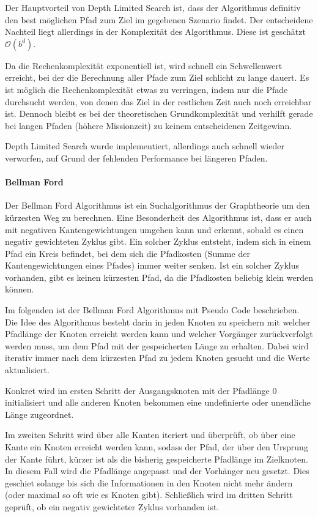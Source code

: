 \documentclass{article}
\begin{document}
Der Hauptvorteil von Depth Limited Search ist, dass der Algorithmus definitiv den
best möglichen Pfad zum Ziel im gegebenen Szenario findet. Der entscheidene
Nachteil liegt allerdings in der Komplexität des Algorithmus. Diese ist geschätzt 
$\mathcal O(b^d)$.

Da die Rechenkomplexität exponentiell ist, wird schnell ein Schwellenwert
erreicht, bei der die Berechnung aller Pfade zum Ziel schlicht zu lange dauert.
Es ist möglich die Rechenkomplexität etwas zu verringen, indem nur die Pfade
durchsucht werden, von denen das Ziel in der restlichen Zeit auch noch
erreichbar ist. Dennoch bleibt es bei der theoretischen Grundkomplexität und
verhilft gerade bei langen Pfaden (höhere Missionzeit) zu keinem entscheidenen
Zeitgewinn.

Depth Limited Search wurde implementiert, allerdings auch schnell wieder
verworfen, auf Grund der fehlenden Performance bei längeren Pfaden.

\paragraph{Bellman Ford}

Der Bellman Ford Algorithmus ist ein Suchalgorithmus der Graphtheorie um den
kürzesten Weg zu berechnen. Eine Besonderheit des Algorithmus ist, dass er auch
mit negativen Kantengewichtungen umgehen kann und erkennt, sobald es einen
negativ gewichteten Zyklus gibt. Ein solcher Zyklus entsteht, indem sich in
einem Pfad ein Kreis befindet, bei dem sich die Pfadkosten (Summe der
Kantengewichtungen eines Pfades) immer weiter senken. Ist ein solcher Zyklus
vorhanden, gibt es keinen kürzesten Pfad, da die Pfadkosten beliebig klein
werden können.

Im folgenden ist der Bellman Ford Algorithmus mit Pseudo Code beschrieben.
Die Idee des Algorithmus besteht darin in jeden Knoten zu speichern mit welcher
Pfadlänge der Knoten erreicht werden kann und welcher Vorgänger zurückverfolgt
werden muss, um dem Pfad mit der gespeicherten Länge zu erhalten. Dabei wird
iterativ immer nach dem kürzesten Pfad zu jedem Knoten gesucht und die Werte
aktualisiert.

Konkret wird im ersten Schritt der Ausgangsknoten mit der Pfadlänge 0
initialisiert und alle anderen Knoten bekommen eine undefinierte oder unendliche
Länge zugeordnet.

Im zweiten Schritt wird über alle Kanten iteriert und überprüft, ob über eine
Kante ein Knoten erreicht werden kann, sodass der Pfad, der über den Ursprung
der Kante führt, kürzer ist als die bisherig gespeicherte Pfadlänge im
Zielknoten. In diesem Fall wird die Pfadlänge angepasst und der Vorhänger neu
gesetzt. Dies geschiet solange bis sich die Informationen in den Knoten nicht
mehr ändern (oder maximal so oft wie es Knoten gibt).
Schließlich wird im dritten Schritt geprüft, ob ein negativ gewichteter Zyklus
vorhanden ist.
\end{document}
